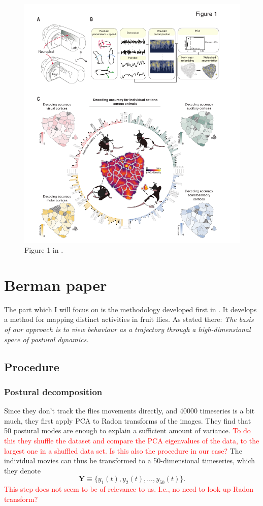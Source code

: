 \documentclass{article}
\theoremstyle{plain}
\theoremstyle{definition}
\theoremstyle{remark}
\begin{document}
\begin{figure}[h]
        \centering
        \includegraphics[width=0.6\linewidth]{./figures/methodology_mimica.png}
        \caption{Figure 1 in \cite{mimica}.}
        \label{fig:methodology_mimica}
\end{figure}

\section{Berman paper}
The part which I will focus on is the methodology developed first in \cite{berman}.
It develops a method for mapping distinct activities in fruit flies.
As stated there: \textit{The basis of our approach is to view behaviour as a trajectory through a high-dimensional space of postural dynamics.}

\subsection{Procedure}
\subsubsection{Postural decomposition}
Since they don't track the flies movements directly, and 40000 timeseries is a bit much, they first apply PCA to Radon transforms of the images.
They find that 50 postural modes are enough to explain a sufficient amount of variance.
\textcolor{red}{To do this they shuffle the dataset and compare the PCA eigenvalues of the data, to the largest one in a shuffled data set.
Is this also the procedure in our case?}
The individual movies can thus be transformed to a 50-dimensional timeseries, which they denote
\begin{equation*}
        \mathbf{Y} \equiv \{ y_1(t), y_2(t), \hdots , y_{50}(t) \}.
\end{equation*}
\textcolor{red}{This step does not seem to be of relevance to us.
I.e., no need to look up Radon transform?}
\end{document}
